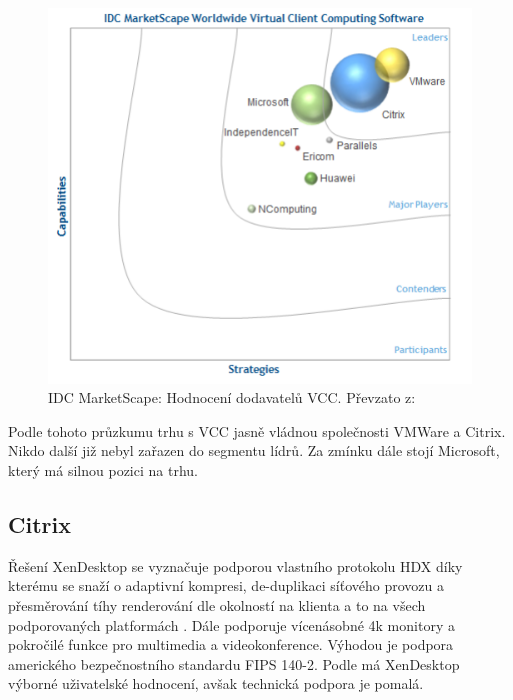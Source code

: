  \begin{figure}[h!]
\includegraphics[width=13cm]{img/IDC_VM}
\caption{IDC MarketScape: Hodnocení dodavatelů VCC. Převzato z: \cite{IDCVCC}} 
\label{IDC_VM}
\centering
\end{figure}%

Podle tohoto průzkumu trhu s VCC jasně vládnou společnosti VMWare a Citrix. Nikdo další již nebyl zařazen do segmentu lídrů. Za zmínku dále stojí Microsoft, který má silnou pozici na trhu.



\subsection{Citrix}
Řešení XenDesktop se vyznačuje podporou vlastního protokolu HDX %
díky kterému se snaží o adaptivní kompresi, de-duplikaci síťového provozu a přesměrování tíhy renderování dle okolností na klienta a to na všech podporovaných platformách \cite{CitrixHDX}. Dále podporuje vícenásobné 4k monitory a pokročilé funkce pro multimedia a videokonference. Výhodou je podpora amerického bezpečnostního standardu FIPS 140-2.
Podle \cite{ForresterWave} má XenDesktop výborné uživatelské hodnocení, avšak technická podpora je pomalá.

